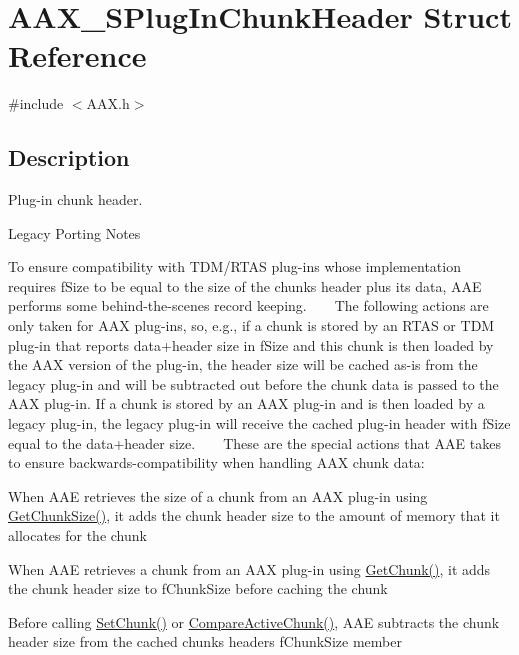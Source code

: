 \hypertarget{a01417}{}\section{A\+A\+X\+\_\+\+S\+Plug\+In\+Chunk\+Header Struct Reference}
\label{a01417}


{\ttfamily \#include $<$A\+A\+X.\+h$>$}



\subsection{Description}
Plug-\/in chunk header. 

\begin{DoxyRefDesc}{Legacy Porting Notes}
\item[\mbox{\hyperlink{a00787__porting_notes000002}{Legacy Porting Notes}}]To ensure compatibility with T\+D\+M/\+R\+T\+AS plug-\/ins whose implementation requires {\ttfamily f\+Size} to be equal to the size of the chunk\textquotesingle{}s header plus its data, A\+AE performs some behind-\/the-\/scenes record keeping. ~\newline
 ~\newline
 The following actions are only taken for A\+AX plug-\/ins, so, e.\+g., if a chunk is stored by an R\+T\+AS or T\+DM plug-\/in that reports data+header size in {\ttfamily f\+Size} and this chunk is then loaded by the A\+AX version of the plug-\/in, the header size will be cached as-\/is from the legacy plug-\/in and will be subtracted out before the chunk data is passed to the A\+AX plug-\/in. If a chunk is stored by an A\+AX plug-\/in and is then loaded by a legacy plug-\/in, the legacy plug-\/in will receive the cached plug-\/in header with {\ttfamily f\+Size} equal to the data+header size. ~\newline
 ~\newline
 These are the special actions that A\+AE takes to ensure backwards-\/compatibility when handling A\+AX chunk data\+:
\begin{DoxyItemize}
\item When A\+AE retrieves the size of a chunk from an A\+AX plug-\/in using \mbox{\hyperlink{a01669_aa986711cd372febcaae803e86ae08f63}{Get\+Chunk\+Size()}}, it adds the chunk header size to the amount of memory that it allocates for the chunk ~\newline

\item When A\+AE retrieves a chunk from an A\+AX plug-\/in using \mbox{\hyperlink{a01669_ab977041a440a9cd6f3e631c059ee8b99}{Get\+Chunk()}}, it adds the chunk header size to {\ttfamily f\+Chunk\+Size} before caching the chunk ~\newline

\item Before calling \mbox{\hyperlink{a01669_a2d780ebc594683e24302871b809602e8}{Set\+Chunk()}} or \mbox{\hyperlink{a01669_a1e86f849e970c9998313fc7d451ccf85}{Compare\+Active\+Chunk()}}, A\+AE subtracts the chunk header size from the cached chunk\textquotesingle{}s header\textquotesingle{}s {\ttfamily f\+Chunk\+Size} member
\end{DoxyItemize}\end{DoxyRefDesc}
